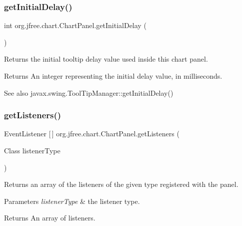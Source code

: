 \subsubsection{\texorpdfstring{get\+Initial\+Delay()}{getInitialDelay()}}
{\footnotesize\ttfamily int org.\+jfree.\+chart.\+Chart\+Panel.\+get\+Initial\+Delay (\begin{DoxyParamCaption}{ }\end{DoxyParamCaption})}

Returns the initial tooltip delay value used inside this chart panel.

\begin{DoxyReturn}{Returns}
An integer representing the initial delay value, in milliseconds.
\end{DoxyReturn}
\begin{DoxySeeAlso}{See also}
javax.\+swing.\+Tool\+Tip\+Manager\+::get\+Initial\+Delay() 
\end{DoxySeeAlso}
\mbox{\label{classorg_1_1jfree_1_1chart_1_1_chart_panel_a0b6c9045c7fd6291221d290f84c68668}} 
\subsubsection{\texorpdfstring{get\+Listeners()}{getListeners()}}
{\footnotesize\ttfamily Event\+Listener \mbox{[}$\,$\mbox{]} org.\+jfree.\+chart.\+Chart\+Panel.\+get\+Listeners (\begin{DoxyParamCaption}\item[{Class}]{listener\+Type }\end{DoxyParamCaption})}

Returns an array of the listeners of the given type registered with the panel.


\begin{DoxyParams}{Parameters}
{\em listener\+Type} & the listener type.\\
\hline
\end{DoxyParams}
\begin{DoxyReturn}{Returns}
An array of listeners. 
\end{DoxyReturn}
\mbox{\label{classorg_1_1jfree_1_1chart_1_1_chart_panel_a7ae12cf78fcd721b6cdcf4eda1b5fd3a}} 
